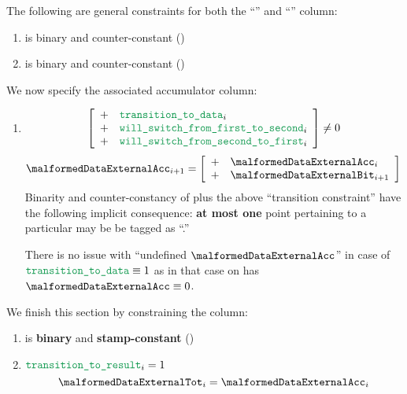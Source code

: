 The following are general constraints for both the ``'' and ``'' column:
\begin{enumerate}[resume]
    \item \malformedDataExternalBit{} is binary and counter-constant \quad (\trash)
    \item \malformedDataExternalAcc{} is binary and counter-constant \quad (\trash)
\end{enumerate}
We now specify the associated accumulator column:
\begin{enumerate}[resume]
    \item \If
        \[
            \left[ \begin{array}{cl}
                + & \locTransitionToData            _{i} \\
                + & \locWillSwitchFromFirstToSecond _{i} \\
                + & \locWillSwitchFromSecondToFirst _{i} \\
            \end{array} \right]
            \neq 0
        \]
        \Then
        \[
            \malformedDataExternalAcc _{i + 1} =
            \left[ \begin{array}{cl}
                + & \malformedDataExternalAcc _{i}     \\
                + & \malformedDataExternalBit _{i + 1} \\
            \end{array} \right]
        \]
        \saNote{}
        Binarity and counter-constancy of \malformedDataExternalAcc{}
        plus the above ``transition constraint''
        have the following implicit consequence:
        \textbf{at most one} point pertaining to a particular \blsId{} may be be tagged as ``\malformedDataExternalBit.''

        \saNote{}
        There is no issue with ``undefined $\malformedDataExternalAcc$'' in case of $\locTransitionToData \equiv 1$
        as in that case on has $\malformedDataExternalAcc \equiv 0$.
\end{enumerate}
We finish this section by constraining the \malformedDataExternalTot{} column:
\begin{enumerate}[resume]
    \item \malformedDataExternalTot{} is \textbf{binary} and \textbf{stamp-constant} \quad (\trash)
    \item \If $\locTransitionToResult_{i} = 1$ \Then
        \[
            \malformedDataExternalTot_{i} = \malformedDataExternalAcc _{i}
        \]
\end{enumerate}
